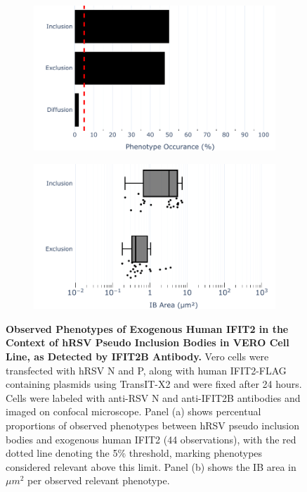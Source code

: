 \begin{figure}
    \begin{subfigure}{0.495\textwidth}
        \caption{}
        \includegraphics[width=1\linewidth]{08. Chapter 3/Figs/03. pIB/03. IFIT2/04. IFIT2-FLAG/02. IFIT2B/01. bar_i2b_hnhp.pdf}
    \end{subfigure}
    \begin{subfigure}{0.495\textwidth}
        \caption{}
        \includegraphics[width=1\linewidth]{08. Chapter 3/Figs/03. pIB/03. IFIT2/04. IFIT2-FLAG/02. IFIT2B/02. box_i2a_hnhp.pdf}
    \end{subfigure}
    \caption[Observed Phenotypes of Exogenous Human IFIT2 in the Context of hRSV Pseudo Inclusion Bodies in VERO Cell Line, as Detected by IFIT2B Antibody.]{\textbf{Observed Phenotypes of Exogenous Human IFIT2 in the Context of hRSV Pseudo Inclusion Bodies in VERO Cell Line, as Detected by IFIT2B Antibody.} Vero cells were transfected with hRSV N and P, along with human IFIT2-FLAG containing plasmids using TransIT-X2 and were fixed after 24 hours. Cells were labeled with anti-RSV N and anti-IFIT2B antibodies and imaged on confocal microscope. Panel (a) shows percentual proportions of observed phenotypes between hRSV pseudo inclusion bodies and exogenous human IFIT2 (44 observations), with the red dotted line denoting the 5\% threshold, marking phenotypes considered relevant above this limit. Panel (b) shows the IB area in \(\mu m^2\) per observed relevant phenotype.}
    \label{fig:Observed Phenotypes of Exogenous Human IFIT2 in the Context of hRSV Pseudo Inclusion Bodies in VERO Cell Line, as Detected by IFIT2B Antibody}
\end{figure}


